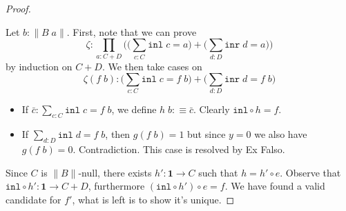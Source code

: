 \documentclass[12pt]{report}
\begin{document}
\begin{proof}
\begin{center}
\end{center}
Let $b : \lVert B\; a\rVert$. 
First, note that we can prove 
$$\zeta : \prod_{a: C+D} \Big(\big(\sum_{c : C} \mathtt{inl}\; c = a\big) + \big( \sum_{d:D} \mathtt{inr}\; d = a \big) \Big)$$
by induction on $C+D$. 
We then take cases on 
$$\zeta (f\; b) : \big(\sum_{c : C} \mathtt{inl}\; c = f\; b\big) + \big( \sum_{d:D} \mathtt{inr}\; d = f\; b \big)$$
\begin{itemize}
	\item If $\bar{c} : \sum_{c : C} \mathtt{inl}\; c = f\; b$, we define $h\; b :\equiv \bar{c}$.
	Clearly $\mathtt{inl} \circ h = f$.
	\item If $\sum_{d : D} \mathtt{inl}\; d = f\; b$, then $g(f\;b) = 1$ but since $y=0$ we also have $g(f\;b) = 0$. Contradiction. 
	This case is resolved by Ex Falso.
\end{itemize}
Since $C$ is $\lVert B \rVert$-null, there exists $h' : \mathbf{1} \rightarrow C$ such that $h = h' \circ e$. 
Observe that $\mathtt{inl} \circ h' : \mathbf{1} \rightarrow C+D$, furthermore $(\mathtt{inl} \circ h') \circ e= f$. 
We have found a valid candidate for $f'$, what is left is to show it's unique. 


\end{proof}
\end{document}
